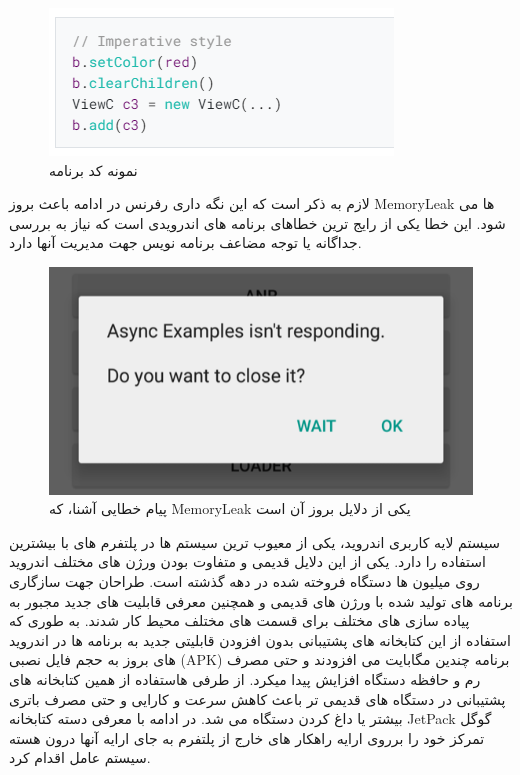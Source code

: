 \documentclass{CSICC2020}
\begin{document}
\begin{figure}[!h]
\includegraphics[width=\linewidth]{Images/android}
\caption{نمونه کد برنامه }
\label{fig:Android}
\end{figure}

لازم به ذکر است که این نگه داری رفرنس در ادامه باعث بروز MemoryLeak ها می شود. این خطا یکی از رایج ترین خطاهای برنامه های اندرویدی است که نیاز به بررسی جداگانه یا توجه مضاعف برنامه نویس جهت مدیریت آنها دارد. 
\cite{androidavoidmemleak}
\cite{androidmemleak}

\begin{figure}[!h]
\includegraphics[width=\linewidth]{Images/android-error}
\caption{پیام خطایی آشنا، که MemoryLeak یکی از دلایل بروز آن است}
\label{fig:AndroidError}
\end{figure}

سیستم لایه کاربری اندروید، یکی از معیوب ترین سیستم ها در پلتفرم های با بیشترین استفاده را دارد. یکی از این دلایل قدیمی و متفاوت بودن ورژن های مختلف اندروید روی میلیون ها دستگاه فروخته شده در دهه گذشته است. طراحان جهت سازگاری برنامه های تولید شده با ورژن های قدیمی و همچنین معرفی قابلیت های جدید مجبور به پیاده سازی  های مختلف برای قسمت های مختلف محیط کار شدند. به طوری که استفاده از این کتابخانه های پشتیبانی بدون افزودن قابلیتی جدید به برنامه ها در اندروید های بروز به حجم فایل نصبی (APK) برنامه چندین مگابایت می افزودند و حتی مصرف رم و حافظه دستگاه افزایش پیدا میکرد. از طرفی هاستفاده از همین کتابخانه های پشتیبانی در دستگاه های قدیمی تر باعث کاهش سرعت و کارایی و حتی مصرف باتری بیشتر یا داغ کردن دستگاه می شد.
در ادامه با معرفی دسته کتابخانه JetPack گوگل تمرکز خود را برروی ارایه راهکار های خارج از پلتفرم به جای ارایه آنها درون هسته سیستم عامل اقدام کرد.
\cite{androidjetpack}
\end{document}
